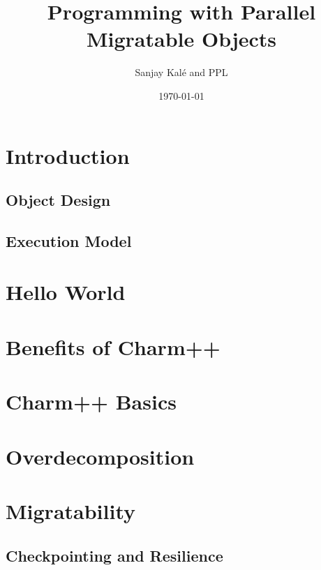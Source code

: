 \documentclass{beamer}
\title[Parallel Migratable Objects]{Programming with Parallel Migratable Objects}
\institute[UIUC]{Parallel Programming Laboratory \\University of Illinois Urbana-Champaign}
\author{Sanjay Kal\'e and PPL}
\date{\today}
\begin{document}
\frame{\titlepage}

\section[Concepts]{Introduction}

\subsection[Object Design]{Object Design}


\subsection[Execution Mode]{Execution Model}

\section[Hello World]{Hello World}


\section[Benefits]{Benefits of Charm++}

\section[Charm++]{Charm++ Basics}


\section[Overdecomposition]{Overdecomposition}


%
\section[Migratability]{Migratability}

\subsection[Fault Tolerance]{Checkpointing and Resilience}

%
\end{document}
